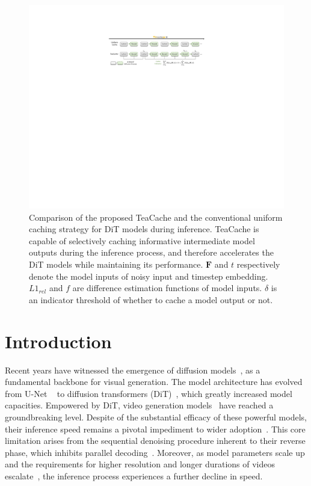 
\begin{figure}[t]
  \centering
    \includegraphics[width=1.0\linewidth]{figs/teacache_arc.pdf}
  \caption{Comparison of the proposed TeaCache and the conventional uniform caching strategy for DiT models during inference. TeaCache is capable of selectively caching informative intermediate model outputs during the inference process, and therefore accelerates the DiT models while maintaining its performance. $\textbf{F}$ and $t$ respectively denote the model inputs of noisy input and timestep embedding. $L1_{rel}$ and $f$ are difference estimation functions of model inputs. $\delta$ is an indicator threshold of whether to cache a model output or not.}
  \label{fig:method_difference}
\end{figure}

\vspace{-0.5cm}
\section{Introduction}
\label{sec:intro}


Recent years have witnessed the emergence of diffusion models~\cite{dhariwal2021diffusion, ho2020denoising, sohl2015deep, song2019generative}, as a fundamental backbone for visual generation.
The model architecture has evolved from U-Net ~\cite{ramesh2022hierarchical, saharia2022photorealistic, blattmann2023stable} to diffusion transformers (DiT)~\cite{peebles2023scalable}, which greatly increased model capacities.
Empowered by DiT, video generation models~\cite{Open-Sora, Open-Sora-Plan, ma2024latte, yang2024cogvideox, Vchitect, Mochi} 
have reached a groundbreaking level.
Despite of the substantial efficacy of these powerful models, their inference speed remains a pivotal impediment to wider adoption~\cite{li2024snapfusion}. This core limitation arises from the sequential denoising procedure inherent to their reverse phase, which inhibits parallel decoding~\cite{shih2024parallel}. Moreover, as model parameters scale up and the requirements for higher resolution and longer durations of videos escalate~\cite{chen2024pixart, yang2024cogvideox}, the inference process experiences a further decline in speed.


